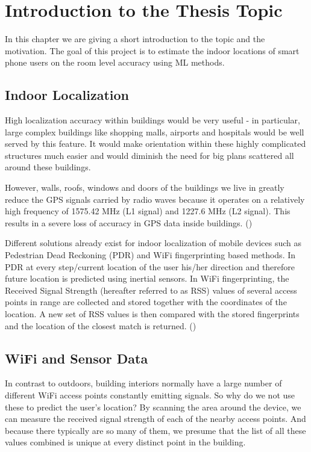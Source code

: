 
\chapter{Introduction to the Thesis Topic} %
\label{Chapter1} %



In this chapter we are giving a short introduction to the topic and the motivation.
The goal of this project is to estimate the indoor locations of smart phone users on the room level accuracy using ML methods.

\section{Indoor Localization}
High localization accuracy within buildings would be very useful - in particular, large complex buildings like shopping malls, airports and hospitals would be well served by this feature. It would make orientation within these highly complicated structures much easier and would diminish the need for big plans scattered all around these buildings.

However, walls, roofs, windows and doors of the buildings we live in greatly reduce the GPS signals carried by radio waves because it operates on a relatively high frequency of 1575.42 MHz (L1 signal) and 1227.6 MHz (L2 signal). This results in a severe loss of accuracy in GPS data inside buildings. (\cite{gps_signal})

Different solutions already exist for indoor localization of mobile devices such as Pedestrian Dead Reckoning (PDR) and WiFi fingerprinting based methods. In PDR at every step/current location of the user his/her direction and therefore future location is predicted using inertial sensors. In WiFi fingerprinting, the Received Signal Strength (hereafter referred to as RSS) values of several access points in range are collected and stored together with the coordinates of the location. A new set of RSS values is then compared with the stored fingerprints and the location of the closest match is returned.  (\cite{survey})


\section{WiFi and Sensor Data}
\label{WiFiAndSensorData}
In contrast to outdoors, building interiors normally have a large number of different WiFi access points constantly emitting signals. So why do we not use these to predict the user's location? By scanning the area around the device, we can measure the received signal strength of each of the nearby access points. And because there typically are so many of them, we presume that the list of all these values combined is unique at every distinct point in the building.

